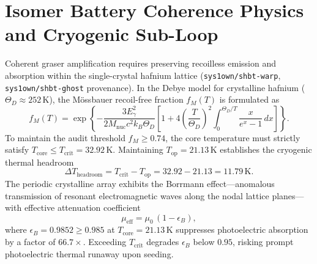\documentclass[10pt,journal,compsoc]{IEEEtran}
\begin{document}
\section{Isomer Battery Coherence Physics and Cryogenic Sub-Loop}
\label{app:isomer}
Coherent graser amplification requires preserving recoilless emission
and absorption within the single-crystal hafnium lattice
(\texttt{sys1own/shbt-warp}, \texttt{sys1own/shbt-ghost} provenance).
In the Debye model for crystalline hafnium
($\Theta_D \approx 252\,\mathrm{K}$), the Mössbauer recoil-free fraction
$f_M(T)$ is formulated as
\begin{equation}
f_M(T) = \exp\left\{ -\frac{3 E_\gamma^2}{2 M_{\mathrm{nuc}} c^2 k_B
\Theta_D} \left[ 1 + 4 \left( \frac{T}{\Theta_D} \right)^2
\int_0^{\Theta_D / T} \frac{x}{e^x - 1}\,dx \right] \right\}.
\end{equation}
To maintain the audit threshold $f_M \ge 0.74$, the core temperature must
strictly satisfy $T_{\mathrm{core}} \le T_{\mathrm{crit}} =
32.92\,\mathrm{K}$. Maintaining $T_{\mathrm{op}} = 21.13\,\mathrm{K}$
establishes the cryogenic thermal headroom
\begin{equation}
\Delta T_{\mathrm{headroom}} = T_{\mathrm{crit}} - T_{\mathrm{op}} =
32.92 - 21.13 = 11.79\,\mathrm{K}.
\end{equation}
The periodic crystalline array exhibits the Borrmann effect---anomalous
transmission of resonant electromagnetic waves along the nodal lattice
planes---with effective attenuation coefficient
\begin{equation}
\mu_{\mathrm{eff}} = \mu_0\,(1 - \epsilon_B),
\end{equation}
where $\epsilon_B = 0.9852 \ge 0.985$ at $T_{\mathrm{core}} =
21.13\,\mathrm{K}$ suppresses photoelectric absorption by a factor of
$66.7\times$. Exceeding $T_{\mathrm{crit}}$ degrades $\epsilon_B$ below
$0.95$, risking prompt photoelectric thermal runaway upon seeding.
\end{document}
